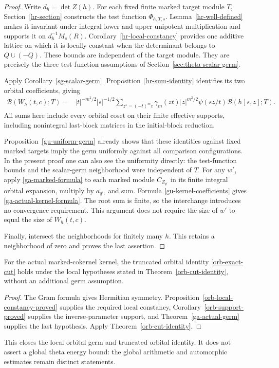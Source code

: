 \begin{proof}
Write $d_h=\det Z(h)$.  For each fixed finite marked target
module $T$, Section~\ref{hr-section} constructs the test function
$\Phi_{h,T,s}$.  Lemma~\ref{hr-well-defined} makes it invariant
under integral lower and upper unipotent multiplication and
supports it on $d_h^{-1}M_s(R)$.  Corollary~\ref{hr-local-constancy}
provides one additive lattice on which it is locally constant
when the determinant belongs to $Q\cup(-Q)$.
These bounds are independent of the target module.
They are precisely the three test-function assumptions of
Section~\ref{sec:theta-scalar-germ}.

Apply Corollary~\ref{sg-scalar-germ}.  Proposition~\ref{hr-sum-identity}
identifies its two orbital coefficients, giving
\begin{align}\label{ga-marked-formula}
 \mathcal B(W_h(t,c);T)
 ={}&|t|^{-m^2/2}|s|^{-1/2}
       \sum_{z^s=(-t)^mc}\gamma_m(zt)|z|^{m^2/2}
               \psi(sz/t)\mathcal B(h[s,z];T).
\end{align}
All sums here include every orbital coset on their finite
effective supports, including nonintegral last-block matrices
in the initial-block reduction.

Proposition~\ref{gu-uniform-germ} already shows that these
identities against fixed marked targets imply the germ
uniformly against all comparison configurations.  In the
present proof one can also see the uniformity directly:
the test-function bounds and the scalar-germ neighborhood
were independent of $T$.  For any $w'$, apply
\eqref{ga-marked-formula} to each marked module $C_{Z_{q'}}$
in its finite integral orbital expansion, multiply by
$\overline{a_{q'}}$, and sum.  Formula
\eqref{gu-kernel-coefficients} gives
\eqref{ga-actual-kernel-formula}.  The root sum is finite,
so the interchange introduces no convergence requirement.
This argument does not require the size of $w'$ to equal
the size of $W_h(t,c)$.

Finally, intersect the neighborhoods for finitely many $h$.
This retains a neighborhood of zero and proves the last assertion.
\end{proof}

\begin{corollary}\label{ga-actual-truncation}
For the actual marked-cokernel kernel, the truncated orbital
identity \eqref{orb-exact-cut} holds under the local hypotheses
stated in Theorem~\ref{orb-cut-identity}, without an additional
germ assumption.
\end{corollary}

\begin{proof}
The Gram formula gives Hermitian symmetry.
Proposition~\ref{orb-local-constancy-proved} supplies the
required local constancy, Corollary~\ref{orb-support-proved}
supplies the inverse-parameter support, and
Theorem~\ref{ga-actual-germ} supplies the last hypothesis.
Apply Theorem~\ref{orb-cut-identity}.
\end{proof}

This closes the local orbital germ and truncated orbital identity.
It does not assert a global theta energy bound: the global
arithmetic and automorphic estimates remain distinct statements.


